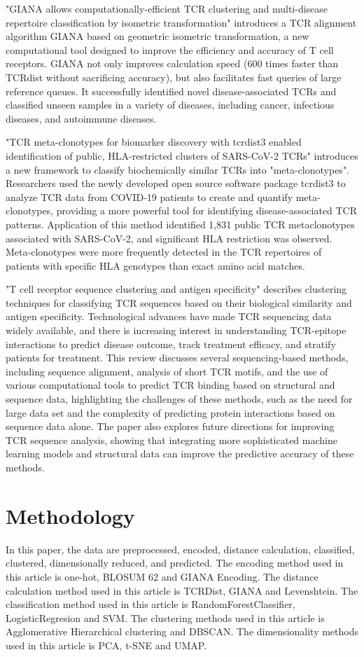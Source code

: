 \documentclass[conference]{IEEEtran}
\begin{document}
	"GIANA allows computationally-efficient TCR clustering and multi-disease repertoire classification by isometric transformation" introduces a TCR alignment algorithm GIANA based on geometric isometric transformation, a new computational tool designed to improve the efficiency and accuracy of T cell receptors. GIANA not only improves calculation speed (600 times faster than TCRdist without sacrificing accuracy), but also facilitates fast queries of large reference queues. It successfully identified novel disease-associated TCRs and classified unseen samples in a variety of diseases, including cancer, infectious diseases, and autoimmune diseases.
	
	"TCR meta-clonotypes for biomarker discovery with tcrdist3 enabled identification of public, HLA-restricted clusters of SARS-CoV-2 TCRs" introduces a new framework to classify biochemically similar TCRs into "meta-clonotypes". Researchers used the newly developed open source software package tcrdist3 to analyze TCR data from COVID-19 patients to create and quantify meta-clonotypes, providing a more powerful tool for identifying disease-associated TCR patterns. Application of this method identified 1,831 public TCR metaclonotypes associated with SARS-CoV-2, and significant HLA restriction was observed. Meta-clonotypes were more frequently detected in the TCR repertoires of patients with specific HLA genotypes than exact amino acid matches.
	
	"T cell receptor sequence clustering and antigen specificity" describes clustering techniques for classifying TCR sequences based on their biological similarity and antigen specificity. Technological advances have made TCR sequencing data widely available, and there is increasing interest in understanding TCR-epitope interactions to predict disease outcome, track treatment efficacy, and stratify patients for treatment. This review discusses several sequencing-based methods, including sequence alignment, analysis of short TCR motifs, and the use of various computational tools to predict TCR binding based on structural and sequence data, highlighting the challenges of these methods, such as the need for large data set and the complexity of predicting protein interactions based on sequence data alone. The paper also explores future directions for improving TCR sequence analysis, showing that integrating more sophisticated machine learning models and structural data can improve the predictive accuracy of these methods.
	
	
	\section{Methodology}
	In this paper, the data are preprocessed, encoded, distance calculation, classified, clustered, dimensionally reduced, and predicted. The encoding method used in this article is one-hot, BLOSUM 62 and GIANA Encoding. The distance calculation method used in this article is TCRDist, GIANA and Levenshtein. The classification method used in this article is RandomForestClassifier, LogisticRegresion and SVM. The clustering methods used in this article is Agglomerative Hierarchical clustering and DBSCAN. The dimensionality methods used in this article is PCA, t-SNE and UMAP.
	
\end{document}
